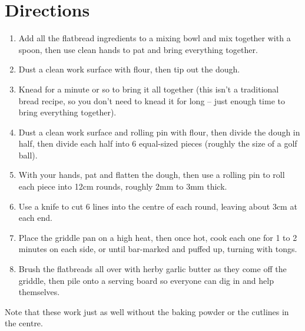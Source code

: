 \section*{Directions}
\begin{enumerate}
	\item Add all the flatbread ingredients to a mixing bowl and mix together with a spoon, then use clean hands to pat and bring everything together.
	\item Dust a clean work surface with flour, then tip out the dough.
	\item Knead for a minute or so to bring it all together (this isn't a traditional bread recipe, so you don't need to knead it for long – just enough time to bring everything together). 
	\item Dust a clean work surface and rolling pin with flour, then divide the dough in half, then divide each half into 6 equal-sized pieces (roughly the size of a golf ball).
	\item With your hands, pat and flatten the dough, then use a rolling pin to roll each piece into 12cm rounds, roughly 2mm to 3mm thick.
	\item Use a knife to cut 6 lines into the centre of each round, leaving about 3cm at each end.
	\item Place the griddle pan on a high heat, then once hot, cook each one for 1 to 2 minutes on each side, or until bar-marked and puffed up, turning with tongs.
	\item Brush the flatbreads all over with herby garlic butter as they come off the griddle, then pile onto a serving board so everyone can dig in and help themselves.
\end{enumerate}
Note that these work just as well without the baking powder or the cutlines in the centre.


